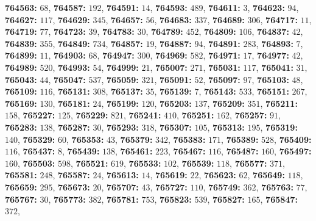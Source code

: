 \textsf{\bfseries 764563:} $68$, \textsf{\bfseries 764587:} $192$, \textsf{\bfseries 764591:} $14$, \textsf{\bfseries 764593:} $489$, \textsf{\bfseries 764611:} $3$, \textsf{\bfseries 764623:} $94$, \textsf{\bfseries 764627:} $117$, \textsf{\bfseries 764629:} $345$, \textsf{\bfseries 764657:} $56$, \textsf{\bfseries 764683:} $337$, \textsf{\bfseries 764689:} $306$, \textsf{\bfseries 764717:} $11$, \textsf{\bfseries 764719:} $77$, \textsf{\bfseries 764723:} $39$, \textsf{\bfseries 764783:} $30$, \textsf{\bfseries 764789:} $452$, \textsf{\bfseries 764809:} $106$, \textsf{\bfseries 764837:} $42$, \textsf{\bfseries 764839:} $355$, \textsf{\bfseries 764849:} $734$, \textsf{\bfseries 764857:} $19$, \textsf{\bfseries 764887:} $94$, \textsf{\bfseries 764891:} $283$, \textsf{\bfseries 764893:} $7$, \textsf{\bfseries 764899:} $11$, \textsf{\bfseries 764903:} $68$, \textsf{\bfseries 764947:} $300$, \textsf{\bfseries 764969:} $582$, \textsf{\bfseries 764971:} $17$, \textsf{\bfseries 764977:} $42$, \textsf{\bfseries 764989:} $520$, \textsf{\bfseries 764993:} $54$, \textsf{\bfseries 764999:} $21$, \textsf{\bfseries 765007:} $271$, \textsf{\bfseries 765031:} $117$, \textsf{\bfseries 765041:} $31$, \textsf{\bfseries 765043:} $44$, \textsf{\bfseries 765047:} $537$, \textsf{\bfseries 765059:} $321$, \textsf{\bfseries 765091:} $52$, \textsf{\bfseries 765097:} $97$, \textsf{\bfseries 765103:} $48$, \textsf{\bfseries 765109:} $116$, \textsf{\bfseries 765131:} $308$, \textsf{\bfseries 765137:} $35$, \textsf{\bfseries 765139:} $7$, \textsf{\bfseries 765143:} $533$, \textsf{\bfseries 765151:} $267$, \textsf{\bfseries 765169:} $130$, \textsf{\bfseries 765181:} $24$, \textsf{\bfseries 765199:} $120$, \textsf{\bfseries 765203:} $137$, \textsf{\bfseries 765209:} $351$, \textsf{\bfseries 765211:} $158$, \textsf{\bfseries 765227:} $125$, \textsf{\bfseries 765229:} $821$, \textsf{\bfseries 765241:} $410$, \textsf{\bfseries 765251:} $162$, \textsf{\bfseries 765257:} $91$, \textsf{\bfseries 765283:} $138$, \textsf{\bfseries 765287:} $30$, \textsf{\bfseries 765293:} $318$, \textsf{\bfseries 765307:} $105$, \textsf{\bfseries 765313:} $195$, \textsf{\bfseries 765319:} $140$, \textsf{\bfseries 765329:} $60$, \textsf{\bfseries 765353:} $43$, \textsf{\bfseries 765379:} $342$, \textsf{\bfseries 765383:} $171$, \textsf{\bfseries 765389:} $528$, \textsf{\bfseries 765409:} $116$, \textsf{\bfseries 765437:} $8$, \textsf{\bfseries 765439:} $138$, \textsf{\bfseries 765461:} $223$, \textsf{\bfseries 765467:} $116$, \textsf{\bfseries 765487:} $160$, \textsf{\bfseries 765497:} $160$, \textsf{\bfseries 765503:} $598$, \textsf{\bfseries 765521:} $619$, \textsf{\bfseries 765533:} $102$, \textsf{\bfseries 765539:} $118$, \textsf{\bfseries 765577:} $371$, \textsf{\bfseries 765581:} $248$, \textsf{\bfseries 765587:} $24$, \textsf{\bfseries 765613:} $14$, \textsf{\bfseries 765619:} $22$, \textsf{\bfseries 765623:} $62$, \textsf{\bfseries 765649:} $118$, \textsf{\bfseries 765659:} $295$, \textsf{\bfseries 765673:} $20$, \textsf{\bfseries 765707:} $43$, \textsf{\bfseries 765727:} $110$, \textsf{\bfseries 765749:} $362$, \textsf{\bfseries 765763:} $77$, \textsf{\bfseries 765767:} $30$, \textsf{\bfseries 765773:} $382$, \textsf{\bfseries 765781:} $753$, \textsf{\bfseries 765823:} $539$, \textsf{\bfseries 765827:} $165$, \textsf{\bfseries 765847:} $372$, 
